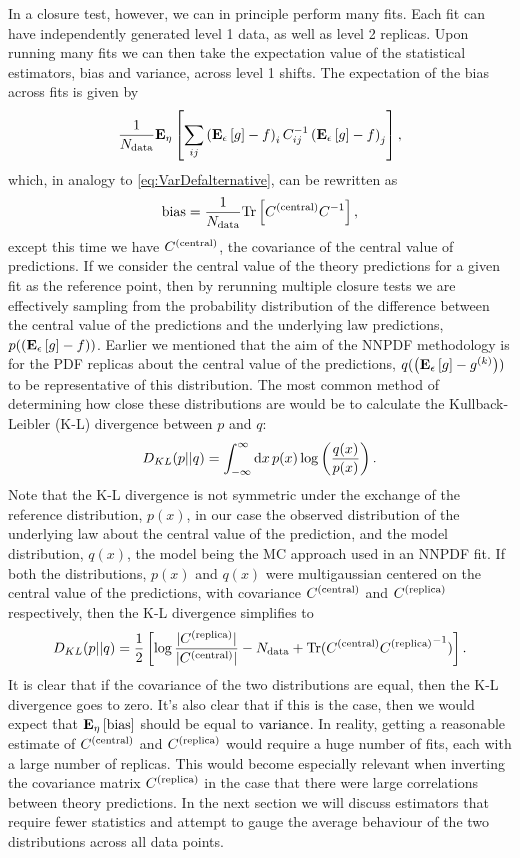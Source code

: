 In a closure test, however, we can in principle perform many
fits. Each fit can have independently generated level 1 data, as well as
level 2 replicas. Upon running many fits we can then take the expectation value
of the statistical estimators, bias and variance, across level 1 shifts. The expectation
of the bias across fits is given by
\begin{equation}
    \frac{1}{N_{\rm data}} \mathbf{E}_{\eta}\left[  \sum_{ij} \left( \mathbf{E}_{\epsilon}\left[ g \right] - f \right)_i C^{-1}_{ij} \left( \mathbf{E}_{\epsilon}\left[ g \right] - f \right)_j  \right],
\end{equation}
which, in analogy to \eqref{eq:VarDefalternative}, can be rewritten as
\begin{equation}
    \label{eq:BiasDefalternative}
    {\rm bias} = \frac{1}{N_{\rm data}} {\rm Tr} \left[ C^{(\rm central)} C^{-1}_{} \right],
\end{equation}
except this time we have $C^{(\rm central)}$, the covariance of the central value
of predictions. If we consider the central value of the theory predictions for
a given fit as the reference point, then by rerunning multiple closure tests
we are effectively sampling from the probability distribution of the
difference between the central value of the predictions and the underlying law
predictions, $p(\left( \mathbf{E}_{\epsilon}\left[ g \right] - f \right))$. Earlier we mentioned that the aim of the NNPDF
methodology is for the PDF replicas about the central value of the predictions,
$q(\left( \mathbf{E}_{\epsilon}\left[ g \right] - g^{(k)}\right))$ to be representative of this distribution. The most common
method of determining how close these distributions are would be to calculate
the Kullback-Leibler (K-L) divergence between $p$ and $q$:
\begin{equation}
    D_{KL}(p || q) = \int_{-\infty}^{\infty} {\rm d} x \, p(x) \log \left(\frac{q(x)}{p(x)} \right).
\end{equation}
Note that the K-L divergence is not symmetric under the exchange of the reference
distribution, $p(x)$, in our case the observed distribution of the underlying law
about the central value of the prediction, and the model distribution, $q(x)$,
the model being the MC approach used in an NNPDF fit. If both the distributions,
$p(x)$ and $q(x)$ were multigaussian centered on the central value of the
predictions, with covariance $C^{(\rm central)}$ and
$C^{(\rm replica)}$ respectively, then the K-L divergence simplifies to
\begin{equation}
    D_{KL}(p || q) = \frac{1}{2} \left[
        \log\frac{|C^{(\rm replica)}|}{|C^{(\rm central)}|}
        - N_{\rm data}
        + {\rm Tr} (C^{(\rm central)} {C^{(\rm replica)}}^{-1})
        \right].
\end{equation}
It is clear that if the covariance of the two distributions are equal, then
the K-L divergence goes to zero. It's also clear that if this is the case,
then we would expect that $\mathbf{E}_{\eta}\left[ {\rm bias} \right]$ should be equal to ${\rm variance}$. In reality,
getting a reasonable estimate of $C^{(\rm central)}$ and $C^{(\rm replica)}$ would require a huge
number of fits, each with a large number of replicas. This would become
especially relevant when inverting the covariance matrix $C^{(\rm replica)}$ in the case
that there were large correlations between theory predictions. In the next
section we will discuss estimators that require fewer statistics and attempt
to gauge the average behaviour of the two distributions across all data points.

